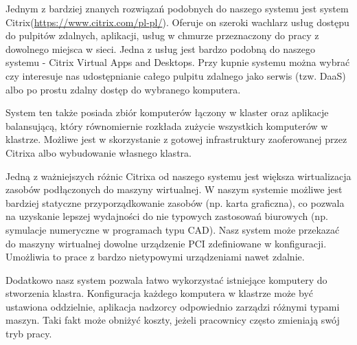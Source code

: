 \documentclass[../wstep.tex]{subfiles}
\begin{document}
	
Jednym z bardziej znanych rozwiązań podobnych do naszego systemu jest system Citrix(\url{https://www.citrix.com/pl-pl/}).
Oferuje on szeroki wachlarz usług dostępu do pulpitów zdalnych, aplikacji, usług w chmurze przeznaczony do pracy z dowolnego miejsca w sieci.
Jedna z usług jest bardzo podobną do naszego systemu - Citrix Virtual Apps and Desktops\parencite{citrix-daas}.
Przy kupnie systemu można wybrać czy interesuje nas udostępnianie całego pulpitu zdalnego jako serwis (tzw. DaaS) albo po prostu zdalny dostęp do wybranego komputera.

System ten także posiada zbiór komputerów łączony w klaster oraz aplikacje balansującą, który równomiernie rozkłada zużycie wszystkich komputerów w klastrze.
Możliwe jest w skorzystanie z gotowej infrastruktury zaoferowanej przez Citrixa albo wybudowanie własnego klastra. 

Jedną z ważniejszych różnic Citrixa od naszego systemu jest większa wirtualizacja zasobów podłączonych do maszyny wirtualnej.
W naszym systemie możliwe jest bardziej statyczne przyporządkowanie zasobów (np. karta graficzna), co pozwala na uzyskanie lepszej wydajności do nie typowych zastosowań biurowych (np. symulacje numeryczne w programach typu CAD).
Nasz system może przekazać do maszyny wirtualnej dowolne urządzenie PCI zdefiniowane w konfiguracji.
Umożliwia to prace z bardzo nietypowymi urządzeniami nawet zdalnie.

Dodatkowo nasz system pozwala łatwo wykorzystać istniejące komputery do stworzenia klastra.
Konfiguracja każdego komputera w klastrze może być ustawiona oddzielnie, aplikacja nadzorcy odpowiednio zarządzi różnymi typami maszyn.
Taki fakt może obniżyć koszty, jeżeli pracownicy często zmieniają swój tryb pracy.
	
\end{document}
